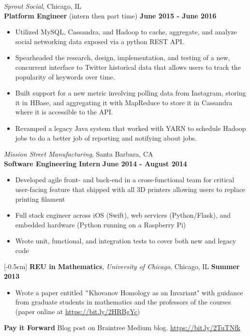 \documentclass[9pt]{res} %
\begin{document}
\begin{resume}
\textit{\color{MidnightBlue}Sprout Social}, Chicago, IL \\
\textbf{Platform Engineer} (intern then part time) \hspace*{\fill} \textbf{June 2015 - June 2016}
\begin{itemize} 
\item Utilized MySQL, Cassandra, and Hadoop to cache, aggregate, and analyze social networking data exposed via a python REST API.
\item Spearheaded the research, design, implementation, and testing of a new, concurrent interface to Twitter historical data that allows users to track the popularity of keywords over time.
\item Built support for a new metric involving polling data from Instagram, storing it in HBase, and aggregating it with MapReduce to store it in Cassandra where it is accessible to the API.
\item Revamped a legacy Java system that worked with YARN to schedule Hadoop jobs to do a better job of reporting and notifying about jobs.
\end{itemize}

\textit{\color{MidnightBlue}Mission Street Manufacturing}, Santa Barbara, CA \\
\textbf{Software Engineering Intern} \hspace*{\fill} \textbf{June 2014 - August 2014}
\begin{itemize}
\item Developed agile front- and back-end in a cross-functional team for critical user-facing feature that shipped with all 3D printers allowing users to replace printing filament
\item Full stack engineer across iOS (Swift), web services (Python/Flask), and embedded hardware (Python running on a Raspberry Pi)
\item Wrote unit, functional, and integration tests to cover both new and legacy code
\end{itemize}

\vspace{-5pt}
[-0.5cm] 
\textbf{REU in Mathematics}, \textit{University of Chicago}, Chicago, IL \hspace{\fill} \textbf{Summer 2013}
\begin{itemize} \itemsep -5pt
\item Wrote a paper entitled $``$Khovanov Homology as an Invariant" with guidance from graduate students in mathematics and the professors of the courses (paper online at \url{https://bit.ly/2HRBgYc})
\end{itemize}
\textbf{Pay it Forward} Blog post on Braintree Medium blog. \url{https://bit.ly/2TuTNfk}



\end{resume}
\end{document}
